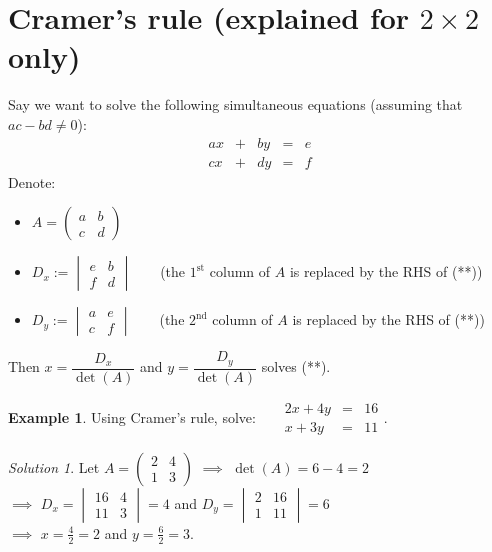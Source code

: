 \documentclass[
  english,
  12pt,
  oneside]{book}
\providecommand{\tightlist}{%
  \setlength{\itemsep}{0pt}\setlength{\parskip}{0pt}}
\theoremstyle{definition}
\theoremstyle{definition}
\newtheorem{example}{Example}[chapter]
\theoremstyle{definition}
\theoremstyle{definition}
\theoremstyle{remark}
\newtheorem*{solution}{Solution}
\begin{document}
\section{\texorpdfstring{Cramer's rule (explained for \(2\times 2\) only)}{Cramer's rule (explained for 2\textbackslash times 2 only)}}\label{cramers-rule-explained-for-2times-2-only}

Say we want to solve the following simultaneous equations (assuming that \(ac-bd\not=0\)):
\begin{equation}
\begin{matrix} ax&+&by&=&e\\ cx&+&dy&=&f\end{matrix}
\tag{\(\ast\ast\)}
\end{equation}
Denote:

\begin{itemize}
\tightlist
\item
  \(A=\begin{pmatrix}a&b\\ c&d\end{pmatrix}\)
\item
  \(D_x := \begin{vmatrix}e&b\\f&d\end{vmatrix}\) ~ ~ (the \(1^\text{st}\) column of \(A\) is replaced by the RHS of (**))
\item
  \(D_y := \begin{vmatrix}a&e\\c&f\end{vmatrix}\) ~ ~ (the \(2^\text{nd}\) column of \(A\) is replaced by the RHS of (**))
\end{itemize}

Then \(x=\dfrac{D_x}{\det(A)}\) and \(y=\dfrac{D_y}{\det(A)}\) solves (**).

\begin{example}
Using Cramer's rule, solve:
~~ \(\begin{matrix}2x+4y &=& 16\\ x+3y &=& 11\end{matrix}\).
\end{example}

\begin{solution}
Let \(A=\begin{pmatrix}2&4\\1&3\end{pmatrix}\) \(\implies\) \(\det(A)=6-4=2\)\\
\(\implies\) \(D_x=\begin{vmatrix}16&4\\11&3\end{vmatrix}=4\) and \(D_y=\begin{vmatrix}2&16\\1&11\end{vmatrix}=6\)\\
\(\implies\) \(x=\frac{4}{2}=2\) and \(y=\frac{6}{2}=3\).
\end{solution}
\end{document}
